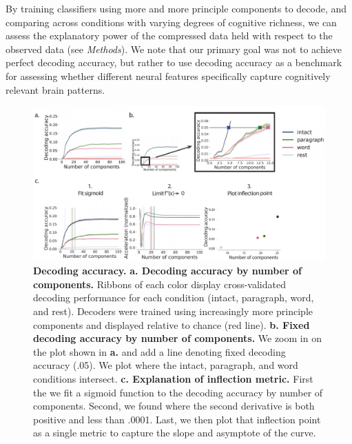 
By training classifiers using more and more principle components to decode, and comparing across conditions with varying degrees of cognitive richness, we can assess the explanatory power of the compressed data held with respect to the observed data (see \textit{Methods}). We note that our primary goal was not to achieve perfect decoding accuracy, but rather to use decoding accuracy as a benchmark for assessing whether different neural features specifically capture cognitively relevant brain patterns.

\begin{figure}
  \centering
  \includegraphics[width=\textwidth]{figs/decode_interpret.pdf}
  \caption{\textbf{Decoding accuracy.} \textbf{a. Decoding accuracy by
      number of components.} Ribbons of each color display
    cross-validated decoding performance for each condition (intact,
    paragraph, word, and rest). Decoders were trained using
    increasingly more principle components and displayed relative to
    chance (red line). \textbf{b. Fixed decoding accuracy by number of
      components.} We zoom in on the plot shown in \textbf{a.} and add
    a line denoting fixed decoding accuracy (.05). We plot where the
    intact, paragraph, and word conditions intersect.
    \textbf{c. Explanation of inflection metric.} First the we fit a sigmoid function to the decoding accuracy by number of components. Second, we found where the second derivative is both positive and less than .0001. Last, we then plot that inflection point as a single metric to capture the slope and asymptote of the curve.}
    \label{fig:decode_interpret}
  \end{figure}





